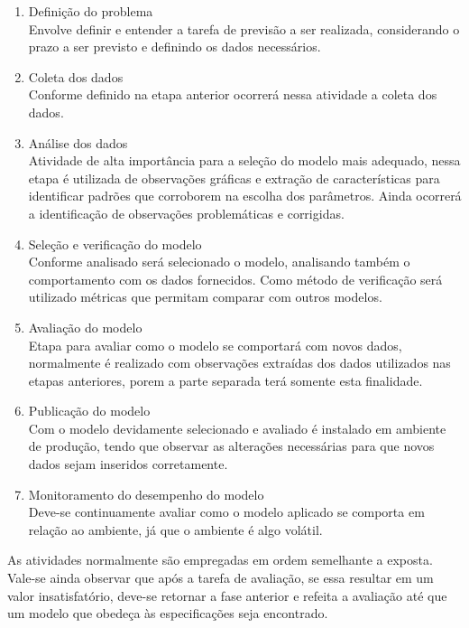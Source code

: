 \documentclass[
    12pt,
    oneside,
    a4paper,
    english,
    brazil
]{abntex2}
\begin{document}
\begin{enumerate}
    \item Definição do problema\\
        Envolve definir e entender a tarefa de previsão a ser realizada, 
        considerando o prazo a ser previsto e definindo os dados necessários.
    \item Coleta dos dados\\
        Conforme definido na etapa anterior ocorrerá nessa atividade a coleta
        dos dados.
    \item Análise dos dados\\
        Atividade de alta importância para a seleção do modelo mais adequado, 
        nessa etapa é utilizada de observações gráficas e extração de 
        características para identificar padrões que corroborem na escolha dos 
        parâmetros. Ainda ocorrerá a identificação de observações problemáticas 
        e corrigidas.
    \item Seleção e verificação do modelo\\
        Conforme analisado será selecionado o modelo, analisando também o 
        comportamento com os dados fornecidos. Como método de verificação será 
        utilizado métricas que permitam comparar com outros modelos.
    \item Avaliação do modelo\\
        Etapa para avaliar como o modelo se comportará com novos dados, 
        normalmente é realizado com observações extraídas dos dados utilizados 
        nas etapas anteriores, porem a parte separada terá somente esta 
        finalidade.
    \item Publicação do modelo\\
        Com o modelo devidamente selecionado e avaliado é instalado em ambiente 
        de produção, tendo que observar as alterações necessárias para que novos 
        dados sejam inseridos corretamente.
    \item Monitoramento do desempenho do modelo\\
        Deve-se continuamente avaliar como o modelo aplicado se comporta em 
        relação ao ambiente, já que o ambiente é algo volátil.
\end{enumerate}

As atividades normalmente são empregadas em ordem semelhante a exposta. Vale-se 
ainda observar que após a tarefa de avaliação, se essa resultar em um valor 
insatisfatório, deve-se retornar a fase anterior e refeita a avaliação até que 
um modelo que obedeça às especificações seja encontrado.
\end{document}
